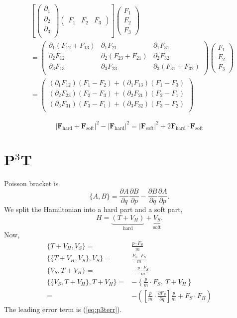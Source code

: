 \documentclass[11pt]{jsarticle}
\begin{document}
\[
\begin{aligned}
&
\left[
\begin{pmatrix}
\partial_1 \\ 
\partial_2 \\ 
\partial_3 \\ 
\end{pmatrix}
\begin{pmatrix}
F_1 & F_2 & F_3
\end{pmatrix}
\right]
\begin{pmatrix}
F_1 \\ F_2 \\ F_3
\end{pmatrix} \\
&=
\begin{pmatrix}
\partial_1 (F_{12} + F_{13}) & \partial_1 F_{21} & \partial_1 F_{31} \\
\partial_2 F_{12} & \partial_2 (F_{23} + F_{21} ) & \partial_2 F_{32} \\
\partial_3 F_{13} & \partial_3 F_{23}  & \partial_3 (F_{31} + F_{32}) \\
\end{pmatrix}
\begin{pmatrix}
F_1 \\ F_2 \\ F_3
\end{pmatrix} \\
&=
\begin{pmatrix}
(\partial_1 F_{12})(F_1 - F_2) + (\partial_1 F_{13})(F_1 - F_3) \\
(\partial_2 F_{23})(F_2 - F_3) + (\partial_2 F_{21})(F_2 - F_1) \\
(\partial_3 F_{31})(F_3 - F_1) + (\partial_3 F_{32})(F_3 - F_2) \\
\end{pmatrix}
\end{aligned}
\]

\[
	| \bm F_\text{hard} + \bm F_\text{soft}|^2 - | \bm F_\text{hard}|^2 = | \bm F_\text{soft}|^2 + 2 \bm F_\text{hard} \cdot \bm F_\text{soft}
\]

\section{P$^3$T} 
Poisson bracket is
\[
	\{A, B\} = 
	\frac{\partial A}{\partial q}\frac{\partial B}{\partial p}  -
	\frac{\partial B}{\partial q}\frac{\partial A}{\partial p}.
\]
We split the Hamiltonian into a hard part and a soft part,
\[
	H = \underbrace{(T + V_H)}_\text{hard} + \underbrace{V_S}_\text{soft}.
\]
Now,
\begin{align}
\{T+V_H, V_S\} =& \frac{p \cdot F_S}{m} \\
\{\{T+V_H, V_S\}, V_S\} =& \frac{F_S \cdot F_S}{m} \label{eq:p3terr} \\
\{V_S, T+V_H\} =& -\frac{p \cdot F_S}{m} \\
\{\{V_S, T+V_H\}, T+V_H\} 
 =& -\left\{\frac{p}{m} \cdot F_S,\  T+V_H \right\} \nonumber \\
 =& - \left(  \left[\frac{p}{m} \cdot \frac{\partial F_S}{\partial q}\right]\frac{p}{m}  + F_S \cdot F_H \right)
\end{align}
The leading error term is (\ref{eq:p3terr}).
\end{document}
